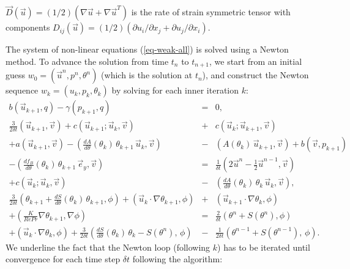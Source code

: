 $\vec D(\vec u) = (1/2)\left( \nabla \vec u + \nabla \vec u^T \right)$ is the rate of strain symmetric tensor with components
$D_{ij}(\vec u) = (1/2) \left( \partial u_i/ \partial x_j + \partial u_j/ \partial x_i \right) $.

The system of non-linear equations (\ref{eq-weak-all}) is solved using a Newton method. To advance the solution from time $t_n$ to $t_{n+1}$, we start from an initial guess $w_0 = (\vec{u}^{n}, p^{n}, \theta^{n})$ (which is the solution at $t_n$), and construct the Newton sequence $w_k = (u_k, p_k, \theta_k)$ by solving for each inner iteration $k$:
\begingroup \small{
	\begin{eqnarray} \label{eq-newton-C1}
	b\left(\vec{u}_{k+1}, q\right) - \gamma (p_{k+1},q) &=& 0, \\ \nonumber
	\frac{3}{2 \delta t} \left(\vec{u}_{k+1},\vec{v}\right)
	+ c\left(\vec{u}_{k+1} ; \vec{u}_{k}, \vec{v} \right)
	&+& c\left(\vec{u}_{k} ; \vec{u}_{k+1}, \vec{v} \right)\\ \nonumber
	+ 
	a\left( \vec{u}_{k+1}, \vec{v}\right)
	- \left(\frac{d A}{d\theta}(\theta_k)\, \theta_{k+1} \, \vec{u}_k, \vec{v}\right)
	&-& \left(A(\theta_k) \, \vec{u}_{k+1}, \vec{v}\right) + b\left(\vec{v}, p_{k+1}\right)  \\ \nonumber
	- {\left(\frac{df_B}{d\theta}(\theta_k)\, \theta_{k+1} \, \vec{e}_y, \vec{v}\right)} &=&  
	\frac{1}{\delta t} \left( 2 \vec{u}^n - \frac{1}{2} \vec{u}^{n-1},\vec{v}\right) \\ \nonumber
	+ c\left(\vec{u}_k ; \vec{u}_{k}, \vec{v} \right) 
	&-& \left(\frac{d A}{d\theta}(\theta_k)\, \theta_{k} \, \vec{u}_k, \vec{v}\right), \,\,\, \\  \nonumber
	\frac{3}{2\delta t} \left(\theta_{k+1} + \frac{dS}{d\theta}(\theta_k)\, \theta_{k+1}, \phi\right)
	+\left(\vec{u}_{k} \cdot \nabla \theta_{k+1} , \phi  \right)
	&+& \left( \vec{u}_{k+1} \cdot \nabla  \theta_k , \phi \right) \\ \nonumber
	+ \left( \frac{K}{Re Pr} \nabla \theta_{k+1}, \nabla \phi \right) 
	&=&
	\frac{2}{\delta t} \left(\theta^n + S(\theta^n) , \phi\right)  \\ \nonumber
	+\left(\vec{u}_{k} \cdot \nabla  \theta_k, \phi \right)
	+ \frac{3}{2 \delta t} \left(\frac{dS}{d\theta}(\theta_k)\, \theta_{k}  - S(\theta^n) ,\, \phi\right) 
	&-& \frac{1}{2 \delta t} \left(\theta^{n-1} + S(\theta^{n-1}),\, \phi\right).\,\,\,
	\end{eqnarray}
} \endgroup
We underline the fact that the Newton loop (following $k$) has to be iterated until convergence for each time step $\delta t$ following the algorithm:

